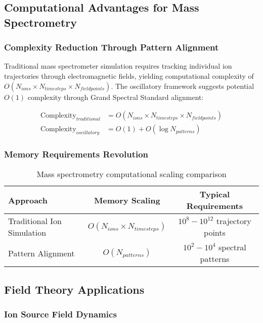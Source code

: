 \documentclass[11pt,a4paper]{article}
\theoremstyle{remark}
\begin{document}
\subsection{Computational Advantages for Mass Spectrometry}

\subsubsection{Complexity Reduction Through Pattern Alignment}

Traditional mass spectrometer simulation requires tracking individual ion trajectories through electromagnetic fields, yielding computational complexity of $O(N_{ions} \times N_{timesteps} \times N_{fieldpoints})$. The oscillatory framework suggests potential $O(1)$ complexity through Grand Spectral Standard alignment:

\begin{align}
\text{Complexity}_{traditional} &= O(N_{ions} \times N_{timesteps} \times N_{fieldpoints})\\
\text{Complexity}_{oscillatory} &= O(1) + O(\log N_{patterns})
\end{align}

\subsubsection{Memory Requirements Revolution}

\begin{table}[H]
\centering
\begin{tabular}{lcc}
\toprule
Approach & Memory Scaling & Typical Requirements \\
\midrule
Traditional Ion Simulation & $O(N_{ions} \times N_{timesteps})$ & $10^8 - 10^{12}$ trajectory points \\
Pattern Alignment & $O(N_{patterns})$ & $10^2 - 10^4$ spectral patterns \\
\bottomrule
\end{tabular}
\caption{Mass spectrometry computational scaling comparison}
\end{table}

\subsection{Field Theory Applications}

\subsubsection{Ion Source Field Dynamics}
\end{document}

